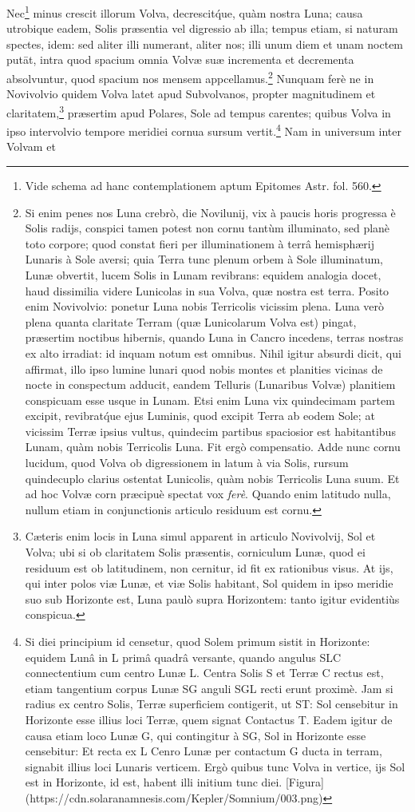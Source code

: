 \documentclass[a4paper, 11pt, oneside, polutonikogreek, german]{article}
\begin{document}
Nec\footnote{Vide schema ad hanc contemplationem aptum Epitomes Astr. fol. 560.} minus crescit illorum Volva, decrescit\'que, quàm nostra Luna; causa utrobique eadem, Solis præsentia vel digressio ab illa; tempus etiam, si naturam spectes, idem: sed aliter illi numerant, aliter nos; illi unum diem et unam noctem putāt, intra quod spacium omnia Volvæ suæ incrementa et decrementa absolvuntur, quod spacium nos mensem appcellamus.\footnote{Si enim penes nos Luna crebrò, die Novilunij, vix à paucis horis progressa è Solis radijs, conspici tamen potest non cornu tantùm illuminato, sed planè toto corpore; quod constat fieri per illuminationem à terrâ hemisphærij Lunaris à Sole aversi; quia Terra tunc plenum orbem à Sole illuminatum, Lunæ obvertit, lucem Solis in Lunam revibrans: equidem analogia docet, haud dissimilia videre Lunicolas in sua Volva, quæ nostra est terra. Posito enim Novivolvio: ponetur Luna nobis Terricolis vicissim plena. Luna verò plena quanta claritate Terram (quæ Lunicolarum Volva est) pingat, præsertim noctibus hibernis, quando Luna in Cancro incedens, terras nostras ex alto irradiat: id inquam notum est omnibus. Nihil igitur absurdi dicit, qui affirmat, illo ipso lumine lunari quod nobis montes et planities vicinas de nocte in conspectum adducit, eandem Telluris (Lunaribus Volvæ) planitiem conspicuam esse usque in Lunam. Etsi enim Luna vix quindecimam partem excipit, revibrat\'que ejus Luminis, quod excipit Terra ab eodem Sole; at vicissim Terræ ipsius vultus, quindecim partibus spaciosior est habitantibus Lunam, quàm nobis Terricolis Luna. Fit ergò compensatio. Adde nunc cornu lucidum, quod Volva ob digressionem in latum à via Solis, rursum quindecuplo clarius ostentat Lunicolis, quàm nobis Terricolis Luna suum. Et ad hoc Volvæ corn præcipuè spectat vox \emph{ferè}. Quando enim latitudo nulla, nullum etiam in conjunctionis articulo residuum est cornu.} Nunquam ferè ne in Novivolvio quidem Volva latet apud Subvolvanos, propter magnitudinem et claritatem,\footnote{Cæteris enim locis in Luna simul apparent in articulo Novivolvij, Sol et Volva; ubi si ob claritatem Solis præsentis, corniculum Lunæ, quod ei residuum est ob latitudinem, non cernitur, id fit ex rationibus visus. At ijs, qui inter polos viæ Lunæ, et viæ Solis habitant, Sol quidem in ipso meridie suo sub Horizonte est, Luna paulò supra Horizontem: tanto igitur evidentiùs conspicua.} præsertim apud Polares, Sole ad tempus carentes; quibus Volva in ipso intervolvio tempore meridiei cornua sursum vertit.\footnote{Si diei principium id censetur, quod Solem primum sistit in Horizonte: equidem Lunâ in L primâ quadrâ versante, quando angulus SLC connectentium cum centro Lunæ L. Centra Solis S et Terræ C rectus est, etiam tangentium corpus Lunæ SG anguli SGL recti erunt proximè. Jam si radius ex centro Solis, Terræ superficiem contigerit, ut ST: Sol censebitur in Horizonte esse illius loci Terræ, quem signat Contactus T. Eadem igitur de causa etiam loco Lunæ G, qui contingitur à SG, Sol in Horizonte esse censebitur: Et recta ex L Cenro Lunæ per contactum G ducta in terram, signabit illius loci Lunaris verticem. Ergò quibus tunc Volva in vertice, ijs Sol est in Horizonte, id est, habent illi initium tunc diei. [Figura](https://cdn.solaranamnesis.com/Kepler/Somnium/003.png)} Nam in universum inter Volvam et 
\end{document}
